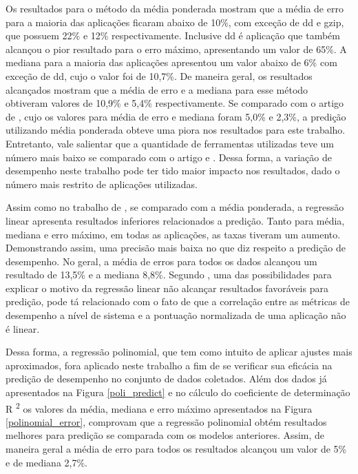 Os resultados para o método da média ponderada mostram que a média de erro para a maioria das aplicações ficaram abaixo de 10\%, com exceção de dd e gzip, que possuem 22\% e 12\% respectivamente. Inclusive dd é aplicação que também alcançou o pior resultado para o erro máximo, apresentando um valor de 65\%. A mediana para a maioria das aplicações apresentou um valor abaixo de 6\% com exceção de dd, cujo o valor foi de 10,7\%. De maneira geral, os resultados alcançados mostram que a média de erro e a mediana para esse método obtiveram valores de 10,9\% e 5,4\% respectivamente. Se comparado com o artigo de , cujo os valores para média de erro e mediana foram 5,0\% e 2,3\%, a predição utilizando média ponderada obteve uma piora nos resultados para este trabalho. Entretanto, vale salientar que a quantidade de ferramentas utilizadas teve um número mais baixo se comparado com o artigo e . Dessa forma, a variação de desempenho neste trabalho pode ter tido maior impacto nos resultados, dado o número mais restrito de aplicações utilizadas. 

Assim como no trabalho de , se comparado com a média ponderada, a regressão linear apresenta resultados inferiores relacionados a predição. Tanto para média, mediana e erro máximo, em todas as aplicações, as taxas tiveram um aumento. Demonstrando assim, uma precisão mais baixa no que diz respeito a predição de desempenho. No geral, a média de erros para todos os dados alcançou um resultado de 13,5\% e a mediana 8,8\%. Segundo \cite{koh2007}, uma das possibilidades para explicar o motivo da regressão linear não alcançar resultados favoráveis para predição, pode tá relacionado com o fato de que a correlação entre as métricas de desempenho a nível de sistema e a pontuação normalizada de uma aplicação não é linear. 

Dessa forma, a regressão polinomial, que tem como intuito de aplicar ajustes mais aproximados, fora aplicado neste trabalho a fim de se verificar sua eficácia na predição de desempenho no conjunto de dados coletados. Além dos dados já apresentados na Figura \ref{poli_predict} e no cálculo do coeficiente de determinação R \textsuperscript{2} os valores da média, mediana e erro máximo apresentados na Figura \ref{polinomial_error}, comprovam que a regressão polinomial obtém resultados melhores para predição se comparada com os modelos anteriores. Assim, de maneira geral a média de erro para todos os resultados alcançou um valor de 5\% e de mediana 2,7\%. 


